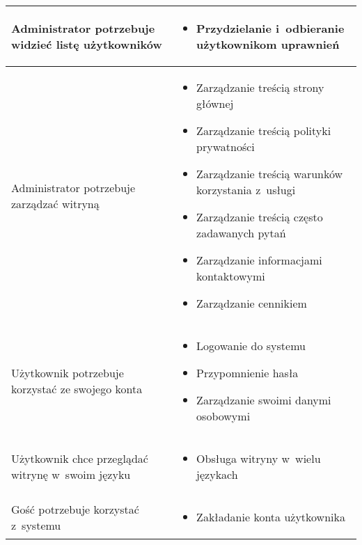 \begin{minipage}{\textwidth}
\begin{table}[H]
\begin{tabular}{|P{.3\textwidth}|P{.6\textwidth}|}
            \hline
            Administrator potrzebuje widzieć listę użytkowników &
            \begin{itemize}
                \item Przydzielanie i~odbieranie użytkownikom uprawnień
            \end{itemize} \\
            \hline
            Administrator potrzebuje zarządzać witryną &
            \begin{itemize}
                \item Zarządzanie treścią strony głównej
                \item Zarządzanie treścią polityki prywatności
                \item Zarządzanie treścią warunków korzystania z~usługi
                \item Zarządzanie treścią często zadawanych pytań
                \item Zarządzanie informacjami kontaktowymi
                \item Zarządzanie cennikiem
            \end{itemize} \\
            \hline
            Użytkownik potrzebuje korzystać ze swojego konta &
            \begin{itemize}
                \item Logowanie do systemu
                \item Przypomnienie hasła
                \item Zarządzanie swoimi danymi osobowymi
            \end{itemize} \\
            \hline
            Użytkownik chce przeglądać witrynę w~swoim języku &
            \begin{itemize}
                \item Obsługa witryny w~wielu językach
            \end{itemize} \\
            \hline
            Gość potrzebuje korzystać z~systemu &
            \begin{itemize}
                \item Zakładanie konta użytkownika
            \end{itemize} \\
            \hline
        \end{tabular}
    \end{table}
\end{minipage}

